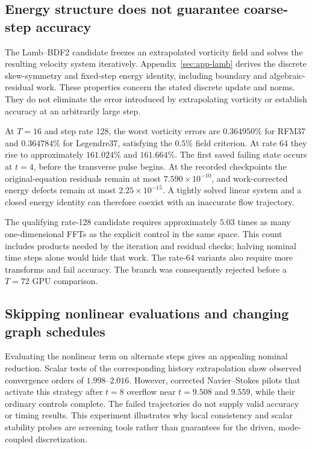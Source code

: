 \subsection{Energy structure does not guarantee coarse-step accuracy}

The Lamb--BDF2 candidate freezes an extrapolated vorticity field and solves the resulting velocity system iteratively. Appendix~\ref{sec:app-lamb} derives the discrete skew-symmetry and fixed-step energy identity, including boundary and algebraic-residual work. These properties concern the stated discrete update and norms. They do not eliminate the error introduced by extrapolating vorticity or establish accuracy at an arbitrarily large step.

At $T=16$ and step rate 128, the worst vorticity errors are $0.364950\%$ for RFM37 and $0.364784\%$ for Legendre37, satisfying the $0.5\%$ field criterion. At rate 64 they rise to approximately $161.024\%$ and $161.664\%$. The first saved failing state occurs at $t=4$, before the transverse pulse begins. At the recorded checkpoints the original-equation residuals remain at most $7.590\times10^{-10}$, and work-corrected energy defects remain at most $2.25\times10^{-15}$. A tightly solved linear system and a closed energy identity can therefore coexist with an inaccurate flow trajectory.

The qualifying rate-128 candidate requires approximately $5.03$ times as many one-dimensional FFTs as the explicit control in the same space. This count includes products needed by the iteration and residual checks; halving nominal time steps alone would hide that work. The rate-64 variants also require more transforms and fail accuracy. The branch was consequently rejected before a $T=72$ GPU comparison.

\subsection{Skipping nonlinear evaluations and changing graph schedules}

Evaluating the nonlinear term on alternate steps gives an appealing nominal reduction. Scalar tests of the corresponding history extrapolation show observed convergence orders of $1.998$--$2.016$. However, corrected Navier--Stokes pilots that activate this strategy after $t=8$ overflow near $t=9.508$ and $9.559$, while their ordinary controls complete. The failed trajectories do not supply valid accuracy or timing results. This experiment illustrates why local consistency and scalar stability probes are screening tools rather than guarantees for the driven, mode-coupled discretization.

